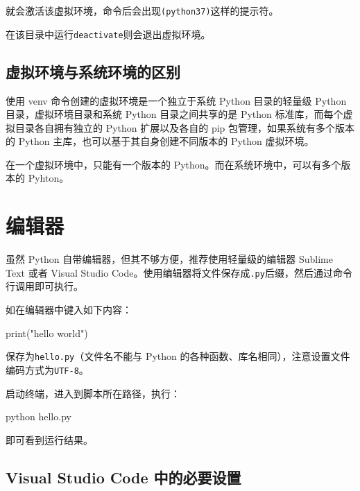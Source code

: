 \documentclass[]{ctexbook}
\newenvironment{Shaded}{\begin{snugshade}}{\end{snugshade}}
\newcommand{\BuiltInTok}[1]{#1}
\newcommand{\ExtensionTok}[1]{#1}
\newcommand{\NormalTok}[1]{#1}
\newcommand{\StringTok}[1]{\textcolor[rgb]{0.31,0.60,0.02}{#1}}
\begin{document}
就会激活该虚拟环境，命令后会出现\texttt{(python37)}这样的提示符。

在该目录中运行\texttt{deactivate}则会退出虚拟环境。

\hypertarget{ux865aux62dfux73afux5883ux4e0eux7cfbux7edfux73afux5883ux7684ux533aux522b}{%
\subsection{虚拟环境与系统环境的区别}\label{ux865aux62dfux73afux5883ux4e0eux7cfbux7edfux73afux5883ux7684ux533aux522b}}

使用 venv 命令创建的虚拟环境是一个独立于系统 Python 目录的轻量级 Python 目录，虚拟环境目录和系统 Python 目录之间共享的是 Python 标准库，而每个虚拟目录各自拥有独立的 Python 扩展以及各自的 pip 包管理，如果系统有多个版本的 Python 主库，也可以基于其自身创建不同版本的 Python 虚拟环境。

在一个虚拟环境中，只能有一个版本的 Python。而在系统环境中，可以有多个版本的 Pyhton。

\hypertarget{ux7f16ux8f91ux5668}{%
\section{编辑器}\label{ux7f16ux8f91ux5668}}

虽然 Python 自带编辑器，但其不够方便，推荐使用轻量级的编辑器 Sublime Text 或者 Visual Studio Code。使用编辑器将文件保存成\texttt{.py}后缀，然后通过命令行调用即可执行。

如在编辑器中键入如下内容：

\begin{Shaded}
\begin{Highlighting}[]
\BuiltInTok{print}\NormalTok{(}\StringTok{"hello world"}\NormalTok{)}
\end{Highlighting}
\end{Shaded}

保存为\texttt{hello.py}（文件名不能与 Python 的各种函数、库名相同），注意设置文件编码方式为\texttt{UTF-8}。

启动终端，进入到脚本所在路径，执行：

\begin{Shaded}
\begin{Highlighting}[]
\ExtensionTok{python}\NormalTok{ hello.py}
\end{Highlighting}
\end{Shaded}

即可看到运行结果。

\hypertarget{visual-studio-code-ux4e2dux7684ux5fc5ux8981ux8bbeux7f6e}{%
\subsection{Visual Studio Code 中的必要设置}\label{visual-studio-code-ux4e2dux7684ux5fc5ux8981ux8bbeux7f6e}}
\end{document}
